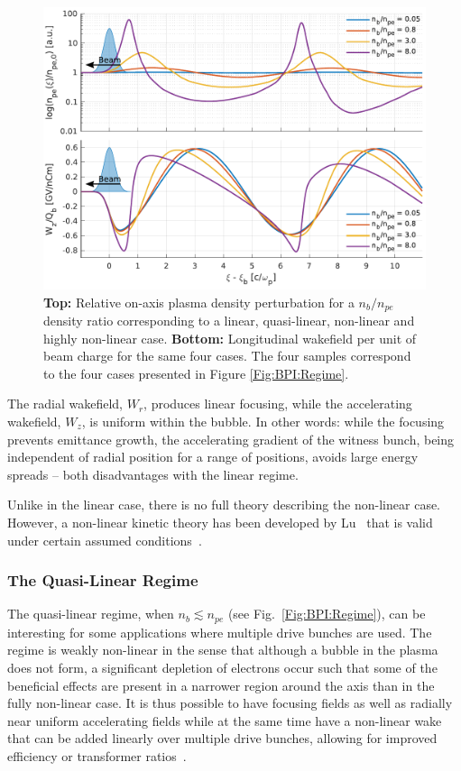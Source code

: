 \begin{figure}[hbt]
    \centering
    \includegraphics[width=0.875\linewidth,trim={0mm 0mm 0mm 0mm},clip]{figures/Density}
    \caption{\label{Fig:BPI:Density}
        \textbf{Top:} Relative on-axis plasma density perturbation for a $n_{b}/n_{pe}$ density ratio corresponding to a linear, quasi-linear, non-linear and highly non-linear case.
        \textbf{Bottom:} Longitudinal wakefield per unit of beam charge for the same four cases.
        The four samples correspond to the four cases presented in Figure \ref{Fig:BPI:Regime}.
    }
\end{figure}

The radial wakefield, $W_{r}$, produces linear focusing, while the accelerating wakefield, $W_{z}$, is uniform within the bubble.
In other words: while the focusing prevents emittance growth, the accelerating gradient of the witness bunch, being independent of radial position for a range of positions, avoids large energy spreads -- both disadvantages with the linear regime.

Unlike in the linear case, there is no full theory describing the non-linear case.
However, a non-linear kinetic theory has been developed by Lu \etal ~that is valid under certain assumed conditions~\cite{lu:2006a,lu:2006}.

\subsubsection{The Quasi-Linear Regime}
\label{Int:BPI:QLin}

The quasi-linear regime, when $n_{b} \lesssim n_{pe}$ (see Fig.~\ref{Fig:BPI:Regime}), can be interesting for some applications where multiple drive bunches are used.
The regime is weakly non-linear in the sense that although a bubble in the plasma does not form, a significant depletion of electrons occur such that some of the beneficial effects are present in a narrower region around the axis than in the fully non-linear case.
It is thus possible to have focusing fields as well as radially near uniform accelerating fields while at the same time have a non-linear wake that can be added linearly over multiple drive bunches, allowing for improved efficiency or transformer ratios~\cite{muggli:2017,rosenzweig:2010}.

